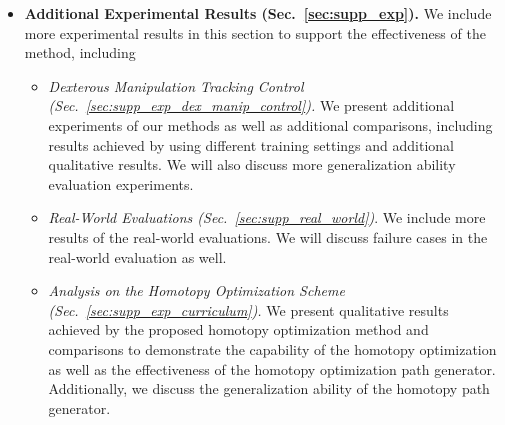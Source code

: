 \begin{itemize}
\begin{itemize}
    \end{itemize}
    \item  \textbf{Additional Experimental Results (Sec.~\ref{sec:supp_exp}).}  We include more experimental results in this section to support the effectiveness of the method, including 
    \begin{itemize}
        \item \textit{Dexterous Manipulation Tracking Control (Sec.~\ref{sec:supp_exp_dex_manip_control}).} We present additional experiments of our methods as well as additional comparisons, including results achieved by using different training settings and additional qualitative results. We will also discuss more generalization ability evaluation experiments. 
        \item \textit{Real-World Evaluations (Sec.~\ref{sec:supp_real_world})}.  We include more results of the real-world evaluations. \textcolor{myblue}{We will discuss failure cases in the real-world evaluation as well.}
        \item \textit{Analysis on the Homotopy Optimization Scheme (Sec.~\ref{sec:supp_exp_curriculum}).} We present qualitative results achieved by the proposed homotopy optimization method and comparisons to demonstrate the capability of the homotopy optimization as well as the effectiveness of the homotopy optimization path generator. \textcolor{myblue}{Additionally, we discuss the generalization ability of the homotopy path generator}. 

\end{itemize}
\end{itemize}
